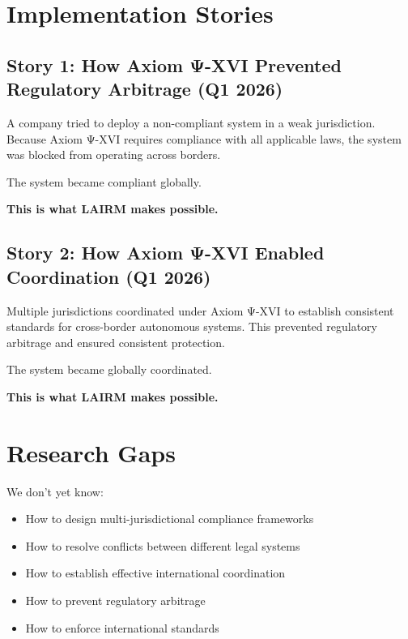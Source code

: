 \vspace{0.5cm}

\section{Implementation Stories}

\subsection{Story 1: How Axiom Ψ-XVI Prevented Regulatory Arbitrage (Q1 2026)}

A company tried to deploy a non-compliant system in a weak jurisdiction. Because Axiom Ψ-XVI requires compliance with all applicable laws, the system was blocked from operating across borders.

The system became compliant globally.

\textbf{This is what LAIRM makes possible.}

\subsection{Story 2: How Axiom Ψ-XVI Enabled Coordination (Q1 2026)}

Multiple jurisdictions coordinated under Axiom Ψ-XVI to establish consistent standards for cross-border autonomous systems. This prevented regulatory arbitrage and ensured consistent protection.

The system became globally coordinated.

\textbf{This is what LAIRM makes possible.}

\vspace{0.5cm}

\section{Research Gaps}

We don't yet know:

\begin{itemize}
    \item How to design multi-jurisdictional compliance frameworks
    
    \item How to resolve conflicts between different legal systems
    
    \item How to establish effective international coordination
    
    \item How to prevent regulatory arbitrage
    
    \item How to enforce international standards
\end{itemize}

